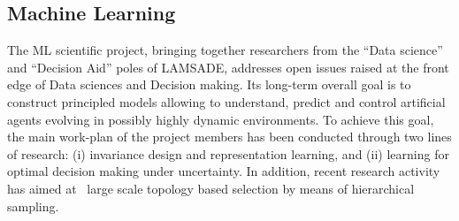 %



\subsection{Machine Learning}The ML scientific project, bringing together researchers from the ``Data science'' and ``Decision Aid'' poles of LAMSADE, addresses  open issues raised at the front edge of Data sciences and Decision making. Its long-term overall goal is to  construct principled models allowing to understand, predict and control artificial agents evolving in  possibly highly dynamic environments. To achieve this goal, the main work-plan of the project members has been conducted through two lines of research: (i) invariance design and representation learning, and (ii) learning for optimal decision making under uncertainty. In addition, recent research activity has aimed at  large scale topology based selection by means of hierarchical sampling.



